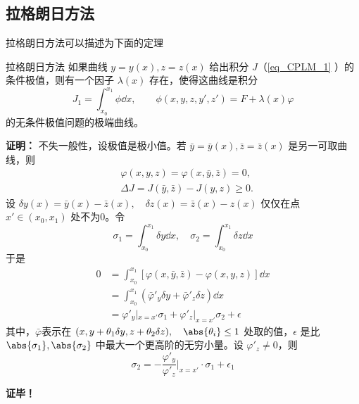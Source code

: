 \subsection{拉格朗日方法}
拉格朗日方法可以描述为下面的定理
\begin{theorem}{拉格朗日方法}
如果曲线 $y=y(x),z=z(x)$ 给出积分 $J$（\autoref{eq_CPLM_1} ）的条件极值，则有一个因子 $\lambda(x)$ 存在，使得这曲线是积分
\begin{equation}
J_1=\int_{x_0}^{x_1}\phi \dd x,\qquad \phi(x,y,z,y',z')=F+\lambda(x)\varphi
\end{equation}
的无条件极值问题的极端曲线。
\end{theorem}
\textbf{证明：}
不失一般性，设极值是极小值。若 $\bar y=\bar y(x),\bar z=\bar z(x)$ 是另一可取曲线，则
\begin{equation}
\begin{aligned}
&\varphi(x,y,z)=\varphi(x,\bar y,\bar z)=0,\\
&\Delta J=J(\bar y,\bar z)-J(y,z)\geq0.
\end{aligned}
\end{equation}
设 $\delta y(x)=\bar y(x)-\bar z(x),\quad\delta z(x)=\bar z(x)-z(x)$ 仅仅在点 $x'\in (x_0,x_1)$ 处不为0。令
\begin{equation}
\sigma_1=\int_{x_0}^{x_1}\delta y\dd x,\quad \sigma_2=\int_{x_0}^{x_1}\delta z\dd x
\end{equation}
于是
\begin{equation}
\begin{aligned}
0&=\int_{x_0}^{x_1}[\varphi(x,\bar y,\bar z)-\varphi(x,y,z)]\dd x\\
&=\int_{x_0}^{x_1}(\bar\varphi'_y\delta y+\bar\varphi'_z\delta z)\dd x\\
&=\varphi'_y|_{x=x'}\sigma_1+\varphi'_z|_{x=x'}\sigma_2+\epsilon
\end{aligned}
\end{equation}
其中，$\bar\varphi$表示在 $(x,y+\theta_1\delta y,z+\theta_2\delta z),\quad \abs{\theta_i}\leq 1$ 处取的值，$\epsilon$ 是比 $\abs{\sigma_1},\abs{\sigma_2}$ 中最大一个更高阶的无穷小量。设 $\varphi'_z\neq0$，则
\begin{equation}
\sigma_2=-\frac{\varphi'_y}{\varphi'_z}\Big|_{x=x'}\cdot\sigma_1+\epsilon_1
\end{equation}


\textbf{证毕！}